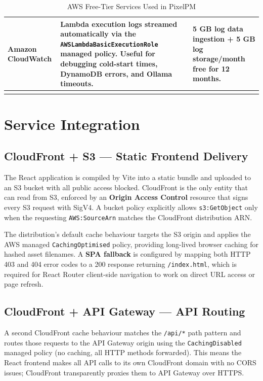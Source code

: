 \documentclass[12pt,a4paper]{report}
\begin{document}
\begin{longtable}{@{}p{3.2cm}p{5.4cm}p{5.6cm}@{}}
  \addlinespace[4pt]
  \textbf{Amazon CloudWatch} &
  Lambda execution logs streamed automatically via the
  \texttt{AWSLambdaBasicExecutionRole} managed policy. Useful for debugging
  cold-start times, DynamoDB errors, and Ollama timeouts. &
  5 GB log data ingestion + 5 GB log storage/month free for 12 months. \\

  \bottomrule
  \caption{AWS Free-Tier Services Used in PixelPM}
  \label{tab:aws_services}
\end{longtable}

\chapter{Service Integration}

\section{CloudFront + S3 — Static Frontend Delivery}

The React application is compiled by Vite into a static bundle and uploaded to an S3
bucket with all public access blocked. CloudFront is the only entity that can read from
S3, enforced by an \textbf{Origin Access Control} resource that signs every S3 request
with SigV4. A bucket policy explicitly allows \texttt{s3:GetObject} only when the
requesting \texttt{AWS:SourceArn} matches the CloudFront distribution ARN.

The distribution's default cache behaviour targets the S3 origin and applies the AWS
managed \texttt{CachingOptimised} policy, providing long-lived browser caching for
hashed asset filenames. A \textbf{SPA fallback} is configured by mapping both HTTP 403
and 404 error codes to a 200 response returning \texttt{/index.html}, which is required
for React Router client-side navigation to work on direct URL access or page refresh.

\section{CloudFront + API Gateway — API Routing}

A second CloudFront cache behaviour matches the \texttt{/api/*} path pattern and routes
those requests to the API Gateway origin using the \texttt{CachingDisabled} managed
policy (no caching, all HTTP methods forwarded). This means the React frontend makes
all API calls to its own CloudFront domain with no CORS issues; CloudFront transparently
proxies them to API Gateway over HTTPS.
\end{document}
